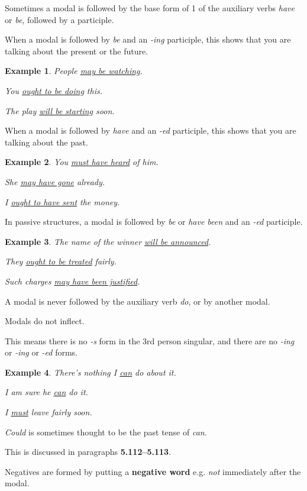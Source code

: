 \documentclass[oneside]{book}
\numberwithin{equation}{section}
\newtheorem{example}{Example}[section]
\begin{document}
%
\noindent{} Sometimes a modal is followed by the base form of 1 of the auxiliary verbs \textit{have} or \textit{be}, followed by a participle.

%
When a modal is followed by \textit{be} and an \textit{-ing} participle, this shows that you are talking about the present or the future.
\begin{example}
    People \underline{may be watching}.
    
    You \underline{ought to be doing} this.
    
    The play \underline{will be starting} soon.
\end{example}
When a modal is followed by \textit{have} and an \textit{-ed} participle, this shows that you are talking about the past.
\begin{example}
    You \underline{must have heard} of him.
    
    She \underline{may have gone} already.
    
    I \underline{ought to have sent} the money.
\end{example}
In passive structures, a modal is followed by \textit{be} or \textit{have been} and an \textit{-ed} participle.
\begin{example}
    The name of the winner \underline{will be announced}.
    
    They \underline{ought to be treated} fairly.
    
    Such charges \underline{may have been justified}.
\end{example}
A modal is never followed by the auxiliary verb \textit{do}, or by another modal.

%
\noindent{} Modals do not inflect.

This means there is no \textit{-s} form in the 3rd person singular, and there are no \textit{-ing} or \textit{-ing} or \textit{-ed} forms.
\begin{example}
    There's nothing I \underline{can} do about it.
    
    I am sure he \underline{can} do it.
    
    I \underline{must} leave fairly soon.
\end{example}
\textit{Could} is sometimes thought to be the past tense of \textit{can}.

This is discussed in paragraphs \textbf{5.112--5.113}.

%
\noindent{} Negatives are formed by putting a \textbf{negative word} e.g. \textit{not} immediately after the modal.
\end{document}
